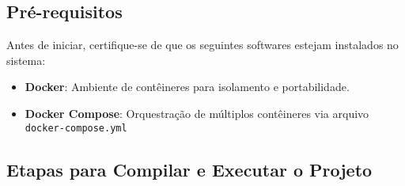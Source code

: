 \documentclass[a4paper,12pt]{article}
\begin{document}
\subsection*{Pré-requisitos}

Antes de iniciar, certifique-se de que os seguintes softwares estejam instalados no sistema:

\begin{itemize}
    \item \textbf{Docker}: Ambiente de contêineres para isolamento e portabilidade.
    \item \textbf{Docker Compose}: Orquestração de múltiplos contêineres via arquivo \texttt{docker-compose.yml}
\end{itemize}

\subsection*{Etapas para Compilar e Executar o Projeto}
\end{document}
